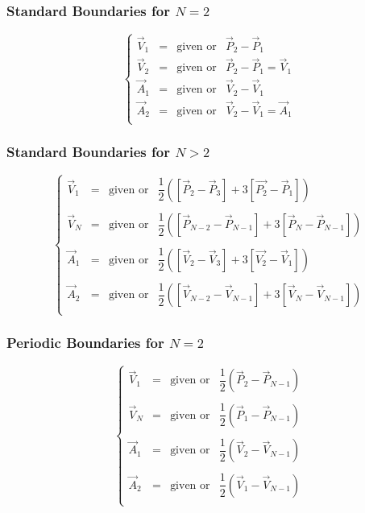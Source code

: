 \documentclass[aps,12pt]{revtex4}
\begin{document}
\subsubsection{Standard Boundaries for $N=2$}
\begin{equation}
\left\lbrace
\begin{array}{rcll}
\vec{V}_1 & = & \text{given or} & \vec{P}_2 - \vec{P}_1\\ 
\vec{V}_2 & = & \text{given or} & \vec{P}_2 - \vec{P}_1 = \vec{V}_1\\
\vec{A}_1 & = & \text{given or} & \vec{V}_2 - \vec{V}_1\\ 
\vec{A}_2 & = & \text{given or} & \vec{V}_2 - \vec{V}_1=\vec{A}_1\\ 
\end{array} 
\right.
\end{equation}

\subsubsection{Standard Boundaries for $N>2$}
\begin{equation}
\left\lbrace
\begin{array}{rcll}
\vec{V}_1 & = & \text{given or} & \dfrac{1}{2}\left( \left[\vec{P}_2 - \vec{P}_3\right] + 3\left[\vec{P_2}-\vec{P}_1\right] \right)\\ 
\\
\vec{V}_N & = & \text{given or} & \dfrac{1}{2}\left( \left[\vec{P}_{N-2}-\vec{P}_{N-1}\right]  + 3\left[\vec{P}_{N} - \vec{P}_{N-1}\right] \right)\\
\\
\vec{A}_1 & = & \text{given or} &  \dfrac{1}{2}\left( \left[\vec{V}_2 - \vec{V}_3\right] + 3\left[\vec{V_2}-\vec{V}_1\right] \right)\\ 
\\
\vec{A}_2 & = & \text{given or} &  \dfrac{1}{2}\left( \left[\vec{V}_{N-2}-\vec{V}_{N-1}\right]  + 3\left[\vec{V}_{N} - \vec{V}_{N-1}\right] \right)\\ 
\end{array}
\right.
\end{equation}


\subsubsection{Periodic Boundaries for $N=2$}
\begin{equation}
\left\lbrace
\begin{array}{rcll}
\vec{V}_1 & = & \text{given or} & \dfrac{1}{2}\left(\vec{P}_2 - \vec{P}_{N-1}\right)\\ 
\\
\vec{V}_N & = & \text{given or} & \dfrac{1}{2}\left(\vec{P}_1 - \vec{P}_{N-1}\right)\\
\\
\vec{A}_1 & = & \text{given or} &  \dfrac{1}{2}\left(\vec{V}_2 - \vec{V}_{N-1}\right)\\ 
\\
\vec{A}_2 & = & \text{given or} &  \dfrac{1}{2}\left(\vec{V}_1 - \vec{V}_{N-1}\right)\\ 
\end{array} 
\right.
\end{equation}
\end{document}
